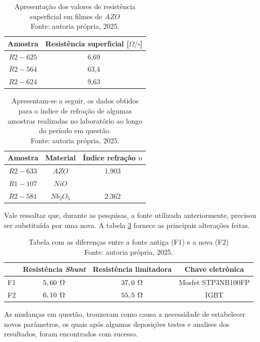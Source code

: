 \begin{table}[H]
    \centering
    \begin{tabular}{cc}
    \hline
        \rowcolor{gray!40} Amostra & Resistência superficial [$\Omega/\square$] \\
         \hline
         \rowcolor{gray!10}$R2-625$& 6,69\\
         \rowcolor{gray!10}$R2-564$& 63,4\\
         \rowcolor{gray!10}$R2-624$& 9,63\\
         \hline
    \end{tabular}
    \caption{Apresentação dos valores de resistência superficial em filmes de $AZO$\\Fonte: autoria própria, 2025.}
    \label{tab:tabela resumo resistências}
\end{table}




\begin{table}[H]
    \centering
    \begin{tabular}{ccc}
    \hline
         \rowcolor{gray!40} Amostra & Material & Índice refração $n$\\
         \hline
        \rowcolor{gray!10}$R2-633$ & $AZO$ &1.903\\
        \rowcolor{gray!10}$R1-107$ & $NiO$ &\\
        \rowcolor{gray!10}$R2-581$ & $Nb_2O_5$ &2.362\\
         \hline
    \end{tabular}
     \caption{Apresentam-se a seguir, os dados obtidos para o índice de refração de algumas amostras realizadas no laboratório ao longo do período em questão.\\Fonte: autoria própria, 2025.}
    \label{tab:Tabela de índices resumo}
\end{table}



Vale ressaltar que, durante as pesquisas, a fonte utilizada anteriormente, precisou ser substituída por uma nova. A tabela \ref{tab:mudanca fonte} fornece as principais alterações feitas.


\begin{table}[H]
    \centering
    \begin{tabular}{cccc}
    \hline
         \rowcolor{gray!40}& Resistência \textit{Shunt} & Resistência limitadora & Chave eletrônica\\
         \hline
         \rowcolor{gray!10}\cellcolor{gray!40}F1& $5,60 \hspace{1.5mm}\Omega$ & $37,0 \hspace{1.5mm}\Omega$ & Mosfet STP3NB100FP\\
         \rowcolor{gray!10}\cellcolor{gray!40}F2& $6,10 \hspace{1.5mm}\Omega$ & $55,5 \hspace{1.5mm}\Omega$ & IGBT\\
         \hline
    \end{tabular}
    \caption{Tabela com as diferenças entre a fonte antiga (F1) e a nova (F2)\\Fonte: autoria própria, 2025.}
    \label{tab:mudanca fonte}
\end{table}

As mudanças em questão, trouxeram como causa a necessidade de estabelecer novos parâmetros, os quais após algumas deposições testes e analises dos resultados, foram encontrados com sucesso.

